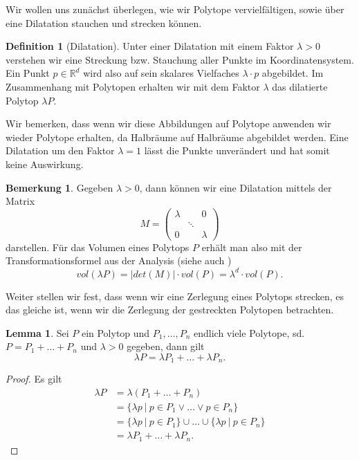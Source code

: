 \documentclass[11pt,titlepage]{article}
\newcommand{\setR}{\mathbb{R}}
\newcommand{\abs}[1]{{\left| #1 \right|}}
\theoremstyle{definition}
\newtheorem{lemma}[theorem]{Lemma}
\newtheorem{definition}[theorem]{Definition}
\newtheorem{remark}[theorem]{Bemerkung}
\theoremstyle{remark}
\begin{document}
	Wir wollen uns zunächst überlegen, wie wir Polytope vervielfältigen, sowie 
	über eine Dilatation stauchen und strecken können. 
	
	\begin{definition}[Dilatation]
		Unter einer Dilatation mit einem Faktor $\lambda>0$ 
		verstehen wir eine Streckung bzw. Stauchung aller Punkte 
		im Koordinatensystem. Ein Punkt $p\in\setR^d$ wird also auf 
		sein skalares Vielfaches $\lambda\cdot p$ abgebildet. Im Zusammenhang mit 
		Polytopen erhalten wir mit dem Faktor $\lambda$ das dilatierte Polytop 
		$\lambda P$.
	\end{definition}
	
	Wir bemerken, dass wenn wir diese Abbildungen auf Polytope anwenden wir wieder Polytope erhalten, da Halbräume auf Halbräume abgebildet werden. 
	Eine Dilatation um den Faktor $\lambda=1$ lässt die Punkte unverändert und 
	hat somit keine Auswirkung. 
	
	\begin{remark}\label{bem:dilvol}
		Gegeben $\lambda >0$, dann können wir eine Dilatation mittels der Matrix
		\[M=\begin{pmatrix}
		\lambda &\ & 0\\
		\ &\ddots &\ \\
		0 &\ &\lambda
		\end{pmatrix}\] 
		darstellen. Für das Volumen eines Polytops $P$ erhält man also mit 
		der Transformationsformel aus der Analysis (siehe auch \cite[Satz 4.7]{SkriptAna3})
		\[vol(\lambda P)=\abs{det(M)}\cdot vol(P)=\lambda^d\cdot vol(P).\]
	\end{remark}
	
	Weiter stellen wir fest, dass wenn wir eine Zerlegung eines Polytops strecken, 
	es das gleiche ist, wenn wir die Zerlegung der gestreckten Polytopen 
	betrachten.
	
	\begin{lemma} \label{lemma:dilzerl}
		Sei $P$ ein Polytop und $P_1,\ldots,P_n$ endlich viele Polytope, sd. 
		$P=P_1+\ldots+P_n$ und $\lambda>0$ gegeben, dann gilt 
		\[\lambda P=\lambda P_1+\ldots+\lambda P_n.\]
	\end{lemma}
	
	\begin{proof}
		Es gilt
		\begin{align*}
			\lambda P&=\lambda(P_1+\ldots+P_n)\\
			&=\{\lambda p\ \vert\ p\in P_1 	\lor\ldots\lor p\in P_n\}\\
			&=\{\lambda p\ \vert\ p\in P_1\}\cup\ldots\cup
			\{\lambda p\ \vert\ p\in P_n\}\\
			&=\lambda P_1 +\ldots+\lambda P_n.
		\end{align*}
	\end{proof}
	
\end{document}
